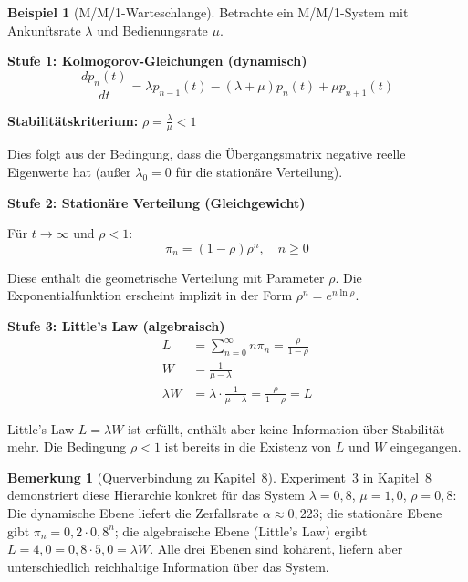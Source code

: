 ﻿\documentclass[a4paper,12pt]{scrreprt}
\theoremstyle{definition}
\newtheorem{bemerkung}{Bemerkung}[section]
\newtheorem{beispiel}{Beispiel}[section]
\begin{document}
\begin{beispiel}[M/M/1-Warteschlange]
	Betrachte ein M/M/1-System mit Ankunftsrate $\lambda$ und Bedienungsrate $\mu$.
	
	\textbf{Stufe 1: Kolmogorov-Gleichungen (dynamisch)}
	\begin{equation}
		\frac{dp_n(t)}{dt} = \lambda p_{n-1}(t) - (\lambda + \mu) p_n(t) + \mu p_{n+1}(t)
	\end{equation}
	
	\textbf{Stabilitätskriterium:} $\rho = \frac{\lambda}{\mu} < 1$
	
	Dies folgt aus der Bedingung, dass die Übergangsmatrix negative reelle Eigenwerte hat (außer $\lambda_0 = 0$ für die stationäre Verteilung).
	
	\textbf{Stufe 2: Stationäre Verteilung (Gleichgewicht)}
	
	Für $t \to \infty$ und $\rho < 1$:
	\begin{equation}
		\pi_n = (1-\rho) \rho^n, \quad n \geq 0
	\end{equation}
	
	Diese enthält die geometrische Verteilung mit Parameter $\rho$. Die Exponentialfunktion erscheint implizit in der Form $\rho^n = e^{n \ln \rho}$.
	
	\textbf{Stufe 3: Little's Law (algebraisch)}
	\begin{align}
		L &= \sum_{n=0}^{\infty} n \pi_n = \frac{\rho}{1-\rho} \\
		W &= \frac{1}{\mu - \lambda} \\
		\lambda W &= \lambda \cdot \frac{1}{\mu - \lambda} = \frac{\rho}{1-\rho} = L
	\end{align}
	
	Little's Law $L = \lambda W$ ist erfüllt, enthält aber keine Information
	über Stabilität mehr.  Die Bedingung $\rho < 1$ ist bereits in die Existenz
	von $L$ und $W$ eingegangen.
	
	\begin{bemerkung}[Querverbindung zu Kapitel~8]
		Experiment~3 in Kapitel~8 demonstriert diese Hierarchie konkret für das
		System $\lambda = 0{,}8$, $\mu = 1{,}0$, $\rho = 0{,}8$: Die
		dynamische Ebene liefert die Zerfallsrate $\alpha \approx 0{,}223$;
		die stationäre Ebene gibt $\pi_n = 0{,}2 \cdot 0{,}8^n$; die
		algebraische Ebene (Little's Law) ergibt $L = 4{,}0 = 0{,}8 \cdot 5{,}0 = \lambda W$.
		Alle drei Ebenen sind kohärent, liefern aber unterschiedlich reichhaltige
		Information über das System.
	\end{bemerkung}
\end{beispiel}
\end{document}
